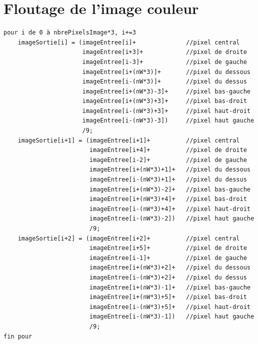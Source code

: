 \documentclass[a4paper,11pt]{article}
\begin{document}
\section{Floutage de l'image couleur}
\begin{verbatim}
pour i de 0 à nbrePixelsImage*3, i+=3
    imageSortie[i] = (imageEntree[i]+              //pixel central
                      imageEntree[i+3]+            //pixel de droite
                      imageEntree[i-3]+            //pixel de gauche
                      imageEntree[i+(nW*3)]+       //pixel du dessous
                      imageEntree[i-(nW*3)]+       //pixel du dessus
                      imageEntree[i+(nW*3)-3]+     //pixel bas-gauche
                      imageEntree[i+(nW*3)+3]+     //pixel bas-droit
                      imageEntree[i-(nW*3)+3]+     //pixel haut-droit
                      imageEntree[i-(nW*3)-3])     //pixel haut gauche
                      /9;
    imageSortie[i+1] = (imageEntree[i+1]+          //pixel central
                        imageEntree[i+4]+          //pixel de droite
                        imageEntree[i-2]+          //pixel de gauche
                        imageEntree[i+(nW*3)+1]+   //pixel du dessous
                        imageEntree[i-(nW*3)+1]+   //pixel du dessus
                        imageEntree[i+(nW*3)-2]+   //pixel bas-gauche
                        imageEntree[i+(nW*3)+4]+   //pixel bas-droit
                        imageEntree[i-(nW*3)+4]+   //pixel haut-droit
                        imageEntree[i-(nW*3)-2])   //pixel haut gauche
                        /9;
    imageSortie[i+2] = (imageEntree[i+2]+          //pixel central
                        imageEntree[i+5]+          //pixel de droite
                        imageEntree[i-1]+          //pixel de gauche
                        imageEntree[i+(nW*3)+2]+   //pixel du dessous
                        imageEntree[i-(nW*3)+2]+   //pixel du dessus
                        imageEntree[i+(nW*3)-1]+   //pixel bas-gauche
                        imageEntree[i+(nW*3)+5]+   //pixel bas-droit
                        imageEntree[i-(nW*3)+5]+   //pixel haut-droit
                        imageEntree[i-(nW*3)-1])   //pixel haut gauche
                        /9;
fin pour
\end{verbatim}
\end{document}

